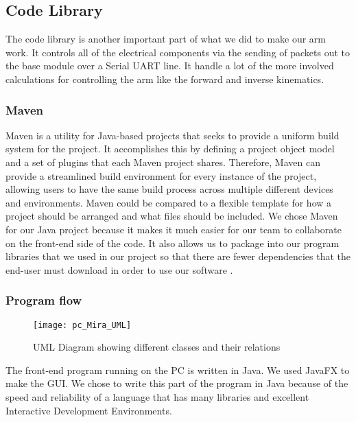 \subsection{Code Library}
The code library is another important part of what we did to make our arm work. It controls all of the electrical components via the sending of packets out to the base module over a Serial UART line. It handle a lot of the more involved calculations for controlling the arm like the forward and inverse kinematics.  

\subsubsection{Maven}
Maven is a utility for Java-based projects that seeks to provide a uniform build system for the project. It accomplishes this by defining a project object model and a set of plugins that each Maven project shares. Therefore, Maven can provide a streamlined build environment for every instance of the project, allowing users to have the same build process across multiple different devices and environments. Maven could be compared to a flexible template for how a project should be arranged and what files should be included. We chose Maven for our Java project because it makes it much easier for our team to collaborate on the front-end side of the code.  It also allows us to package into our program libraries that we used in our project so that there are fewer dependencies that the end-user must download in order to use our software \cite{maven}.


\subsubsection{Program flow}

\begin{figure}[H]
\centering
\texttt{[image: pc\_Mira\_UML]}
\caption{UML Diagram showing different classes and their relations}
\label{fig:Functional_Block_Diagram}
\end{figure}

\noindent The front-end program running on the PC is written in Java. We used JavaFX to make the GUI. We chose to write this part of the program in Java because of the speed and reliability of a language that has many libraries and excellent Interactive Development Environments.  

